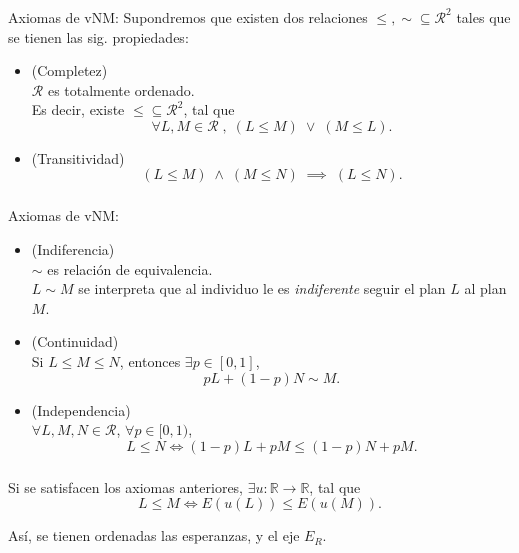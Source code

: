 \documentclass{beamer}
\begin{document}
\begin{frame}[t,fragile]
	\frametitle{\subsecname}
	\begin{block}{\centering Axiomas de vNM:}
		Supondremos que existen dos relaciones \(\leqslant , \sim \subseteq 
		\mathscr{R} ^ 2\) tales que se tienen las sig. propiedades:
		\begin{itemize}
			\item (Completez) \\ 
				\(\mathscr{R}\) es totalmente ordenado. \\ 
				Es decir, existe \(\leqslant \subseteq \mathscr{R} ^ 2\),
				tal que
				\[
					\forall L,M \in \mathscr{R} \;,\; 
					(L \leqslant M) \;\vee\; (M \leqslant L).
				\]
			\item (Transitividad) 
				\[
					(L \leqslant M) \;\land\; (M \leqslant N) \;\implies\; 
					(L \leqslant N).
				\]
		\end{itemize}
	\end{block}
\end{frame}

\begin{frame}[t,fragile]
	\frametitle{\subsecname}
	\begin{block}{\centering Axiomas de vNM:}
		\begin{itemize}
			\item (Indiferencia) \\ 
				\(\sim\) es relación de equivalencia. \\ 
				\(L \sim M\) se interpreta que al individuo le es 
				\textit{indiferente} seguir el
				plan \(L\) al plan \(M\).
			\item (Continuidad) \\ 
				Si \(L \leqslant M \leqslant N\), entonces \(\exists p \in [0,1]\),
				\[
					pL + (1-p) N \sim M.
				\]
			\item (Independencia) \\ 
				\(\forall L,M,N \in \mathscr{R}\), 
				\(\forall p \in [0,1)\),
				\[
					L \leqslant N \iff 
					(1-p) L + pM \leqslant (1-p) N + pM.
				\]
		\end{itemize}
	\end{block}
\end{frame}

\begin{frame}[t,fragile]
	\frametitle{\subsecname}
	\begin{theorem}
		Si se satisfacen los axiomas anteriores,
		\(\exists u: \mathbb{R} \longrightarrow \mathbb{R}\), tal que
		\[
			L \leqslant M \iff 
			E(u(L)) \leqslant E(u(M)).
		\]
	\end{theorem}
	\pause
	Así, se tienen ordenadas las esperanzas, y el eje \(E_R\).
\end{frame}
\end{document}
